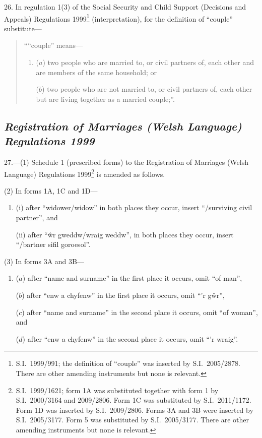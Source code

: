 \documentclass[12pt,a4paper]{article}
\begin{document}
26.  In regulation 1(3) of the Social Security and Child Support (Decisions and Appeals) Regulations 1999\footnote{S.I.~1999/991; the definition of “couple” was inserted by S.I.~2005/2878. There are other amending instruments but none is relevant.} (interpretation), for the definition of “couple” substitute—
\begin{quotation}
““couple” means—
\begin{enumerate}\item[]
($a$) 
two people who are married to, or civil partners of, each other and are members of the same household; or

($b$) 
two people who are not married to, or civil partners of, each other but are living together as a married couple;”.
\end{enumerate}
\end{quotation}

\subsection*{\itshape Registration of Marriages (Welsh Language) Regulations 1999}

27.—(1) Schedule 1 (prescribed forms) to the Registration of Marriages (Welsh Language) Regulations 1999\footnote{S.I.~1999/1621; form 1A was substituted together with form 1 by S.I.~2000/3164 and 2009/2806. Form 1C was substituted by S.I.~2011/1172. Form 1D was inserted by S.I.~2009/2806. Forms 3A and 3B were inserted by S.I.~2005/3177. Form 5 was substituted by S.I.~2005/3177. There are other amending instruments but none is relevant.} is amended as follows.

(2) In forms 1A, 1C and 1D—
\begin{enumerate}\item[]
(i) after “widower/widow” in both places they occur, insert “/surviving civil partner”, and

(ii) after \foreignlanguage{welsh}{“\^wr gweddw/wraig weddw”,} in both places they occur, insert \foreignlanguage{welsh}{“/bartner sifil goroesol”.}
\end{enumerate}

(3) In forms 3A and 3B—
\begin{enumerate}\item[]
($a$) after “name and surname” in the first place it occurs, omit “of man”,

($b$) after \foreignlanguage{welsh}{“enw a chyfenw”} in the first place it occurs, omit \foreignlanguage{welsh}{“’r g\^wr”,}

($c$) after “name and surname” in the second place it occurs, omit “of woman”, and

($d$) after \foreignlanguage{welsh}{“enw a chyfenw”} in the second place it occurs, omit \foreignlanguage{welsh}{“’r wraig”.}
\end{enumerate}
\end{document}
